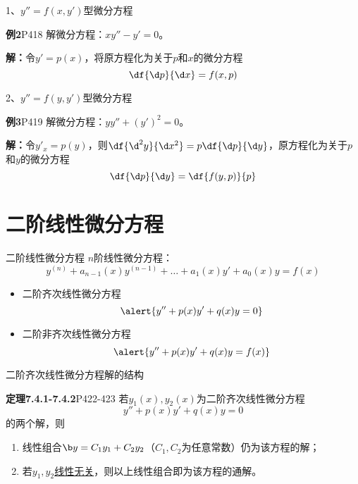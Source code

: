 \begin{frame}{1、$y''=f(x,y')$型微分方程}
	\linespread{1.5}\pause
	\begin{exampleblock}{{\bf 例2}\hfill P418}
		解微分方程：$xy''-y'=0$。
	\end{exampleblock}
	\pause 
	\alert{\bf 解：}令$y'=p(x)$，\pause 将原方程化为关于$p$和$x$的微分方程
	$$\df{\d p}{\d x}=f(x,p)$$
\end{frame}

\begin{frame}{2、$y''=f(y,y')$型微分方程}
	\linespread{1.5}\pause 
	\begin{exampleblock}{{\bf 例3}\hfill P419}
		解微分方程：$yy''+(y')^2=0$。
	\end{exampleblock}\pause
	\alert{\bf 解：}令$y'_x=p(y)$，\pause 则$\df{\d^2y}{\d x^2}=p\df{\d p}{\d
	y}$，\pause 原方程化为关于$p$和$y$的微分方程 $$\df{\d p}{\d y}=\df{f(y,p)}{p}$$ 
	
\end{frame}


\section{二阶线性微分方程}

\begin{frame}{二阶线性微分方程}
	\linespread{1.2}\pause 
	{\bb $n$阶线性微分方程：}
	$$y^{(n)}+a_{n-1}(x)y^{(n-1)}+\ldots+a_1(x)y'+a_0(x)y=f(x)$$\pause 
	\vspace{-1em}
	\begin{itemize}
	  \item {\bb 二阶齐次线性微分方程}
	  $$\alert{y''+p(x)y'+q(x)y=0}$$\pause
	  \vspace{-1em} 
	  \item {\bb 二阶非齐次线性微分方程}
	  $$\alert{y''+p(x)y'+q(x)y=f(x)}$$
	\end{itemize}
\end{frame}

\begin{frame}{二阶齐次线性微分方程解的结构}
	\linespread{1.2}\pause 
	\begin{block}{{\bf 定理7.4.1-7.4.2}\hfill P422-423}
		若$y_1(x),y_2(x)$为二阶齐次线性微分方程
		$$y''+p(x)y'+q(x)y=0$$
		的两个解，则\pause 
		\begin{enumerate}
		  \item 线性组合${\b y=C_1y_1+C_2y_2}$（$C_1,C_2$为任意常数）仍为该方程的解；\pause 
		  \item 若$y_1,y_2${\b\underline{线性无关}}，则以上线性组合即为该方程的通解。
		\end{enumerate}
	\end{block}
\end{frame}

